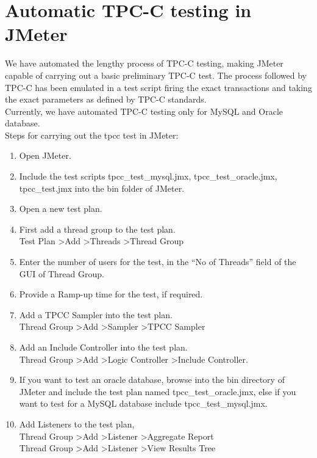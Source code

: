 \documentclass[12pt]{book}
\begin{document}
 \section{Automatic TPC-C testing in JMeter}
  We have automated the lengthy process of TPC-C testing, making JMeter capable of carrying out a basic preliminary TPC-C test.
  The process followed by TPC-C has been emulated in a test script firing the exact transactions and taking the exact parameters as 
  defined by TPC-C standards.\\
  Currently, we have automated TPC-C testing only for MySQL and Oracle database.\\
  Steps for carrying out the tpcc test in JMeter:
 \begin{enumerate}
  \item Open JMeter.
  \item Include the test scripts tpcc\_test\_mysql.jmx, tpcc\_test\_oracle.jmx, tpcc\_test.jmx into the bin folder of JMeter.
  \item Open a new test plan. 
  \item First add a thread group to the test plan.\\
	Test Plan \textgreater Add \textgreater Threads \textgreater Thread Group 
  \item Enter the number of users for the test, in the “No of Threads” field of the GUI of Thread Group. 
  \item Provide a Ramp-up time for the test, if required.
  \item Add a TPCC Sampler into the test plan.\cite{Results}\\ 
        Thread Group \textgreater Add \textgreater Sampler \textgreater TPCC Sampler
  \item Add an Include Controller into the test plan.\\
        Thread Group \textgreater Add \textgreater Logic Controller \textgreater Include Controller.
  \item	If you want to test an oracle database, browse into the bin directory of JMeter and include the test plan named tpcc\_test\_oracle.jmx, 
	else if you want to test for a MySQL database include tpcc\_test\_mysql.jmx.
  \item Add Listeners to the test plan,\\
	Thread Group \textgreater Add \textgreater Listener \textgreater Aggregate Report\\ 
	Thread Group \textgreater Add \textgreater Listener \textgreater View Results Tree\\

\end{enumerate}
\end{document}
